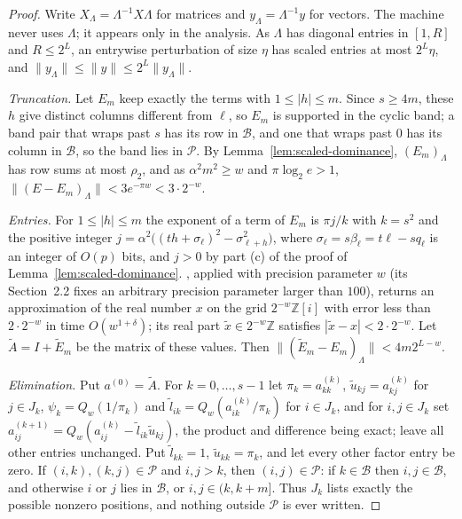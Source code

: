 \begin{proof}
Write $X_\Lambda=\Lambda^{-1}X\Lambda$ for matrices and $y_\Lambda=\Lambda^{-1}y$
for vectors. The machine never uses $\Lambda$; it appears only in the
analysis. As $\Lambda$ has diagonal entries in $[1,R]$ and $R\le2^L$, an
entrywise perturbation of size $\eta$ has scaled entries at most $2^L\eta$, and
$\|y_\Lambda\|\le\|y\|\le2^L\|y_\Lambda\|$.

\emph{Truncation.} Let $E_m$ keep exactly the terms with $1\le|h|\le m$. Since
$s\ge4m$, these $h$ give distinct columns different from $\ell$, so $E_m$ is
supported in the cyclic band; a band pair that wraps past $s$ has its row in
$\mathcal B$, and one that wraps past $0$ has its column in $\mathcal B$, so
the band lies in $\mathcal P$. By Lemma~\ref{lem:scaled-dominance},
$(E_m)_\Lambda$ has row sums at most $\rho_2$, and as $\alpha^2m^2\ge w$ and
$\pi\log_2e>1$, $\|(E-E_m)_\Lambda\|<3e^{-\pi w}<3\cdot2^{-w}$.

\emph{Entries.} For $1\le|h|\le m$ the exponent of a term of $E_m$ is
$\pi j/k$ with $k=s^2$ and the positive integer
$j=\alpha^2\bigl((th+\sigma_\ell)^2-\sigma_{\ell+h}^2\bigr)$, where
$\sigma_\ell=s\beta_\ell=t\ell-sq_\ell$ is an integer of $O(p)$ bits, and
$j>0$ by part (c) of the proof of Lemma~\ref{lem:scaled-dominance}.
\cite[Lemma~2.13]{HarveyHoeven2021}, applied with precision
parameter $w$ (its Section~2.2 fixes an arbitrary precision parameter larger
than $100$), returns an approximation of the real number $x$ on the grid
$2^{-w}\mathbb Z[i]$ with error less than $2\cdot2^{-w}$ in time
$O(w^{1+\delta})$; its real part $\tilde x\in2^{-w}\mathbb Z$ satisfies
$|\tilde x-x|<2\cdot2^{-w}$. Let
$\widetilde A=I+\widetilde E_m$ be the matrix of these values. Then
$\|(\widetilde E_m-E_m)_\Lambda\|<4m2^{L-w}$.

\emph{Elimination.} Put $a^{(0)}=\widetilde A$. For $k=0,\ldots,s-1$ let
$\pi_k=a^{(k)}_{kk}$, $\tilde u_{kj}=a^{(k)}_{kj}$ for $j\in J_k$,
$\psi_k=Q_w(1/\pi_k)$ and $\tilde l_{ik}=Q_w(a^{(k)}_{ik}/\pi_k)$ for
$i\in J_k$, and for $i,j\in J_k$ set
$a^{(k+1)}_{ij}=Q_w(a^{(k)}_{ij}-\tilde l_{ik}\tilde u_{kj})$, the product and
difference being exact; leave all other entries unchanged. Put
$\tilde l_{kk}=1$, $\tilde u_{kk}=\pi_k$, and let every other factor entry be
zero. If $(i,k),(k,j)\in\mathcal P$ and $i,j>k$, then $(i,j)\in\mathcal P$:
if $k\in\mathcal B$ then $i,j\in\mathcal B$, and otherwise $i$ or $j$ lies in
$\mathcal B$, or $i,j\in(k,k+m]$. Thus $J_k$ lists exactly the possible
nonzero positions, and nothing outside $\mathcal P$ is ever written.


\end{proof}
